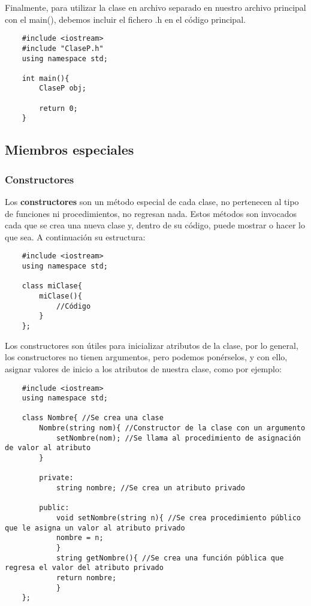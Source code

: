 Finalmente, para utilizar la clase en archivo separado en nuestro archivo principal con el main(), debemos incluir el fichero .h en el código principal.
\begin{lstlisting}
    #include <iostream>
    #include "ClaseP.h"
    using namespace std;
    
    int main(){
        ClaseP obj;
        
        return 0;
    }
\end{lstlisting}


\subsection{Miembros especiales}


\subsubsection{Constructores}
\hspace{0.55cm}Los \textbf{constructores} son un método especial de cada clase, no pertenecen al tipo de funciones ni procedimientos, no regresan nada. Estos métodos son invocados cada que se crea una nueva clase y, dentro de su código, puede mostrar o hacer lo que sea. A continuación su estructura:
\begin{lstlisting}
    #include <iostream>
    using namespace std;
    
    class miClase{
        miClase(){
            //Código
        }
    };
\end{lstlisting}

Los constructores son útiles para inicializar atributos de la clase, por lo general, los constructores no tienen argumentos, pero podemos ponérselos, y con ello, asignar valores de inicio a los atributos de nuestra clase, como por ejemplo:
\begin{lstlisting}
    #include <iostream>
    using namespace std;

    class Nombre{ //Se crea una clase
        Nombre(string nom){ //Constructor de la clase con un argumento
            setNombre(nom); //Se llama al procedimiento de asignación de valor al atributo
        }
        
        private:
            string nombre; //Se crea un atributo privado
        
        public:
            void setNombre(string n){ //Se crea procedimiento público que le asigna un valor al atributo privado
            nombre = n;
            }
            string getNombre(){ //Se crea una función pública que regresa el valor del atributo privado
            return nombre;
            }
    };
\end{lstlisting}

